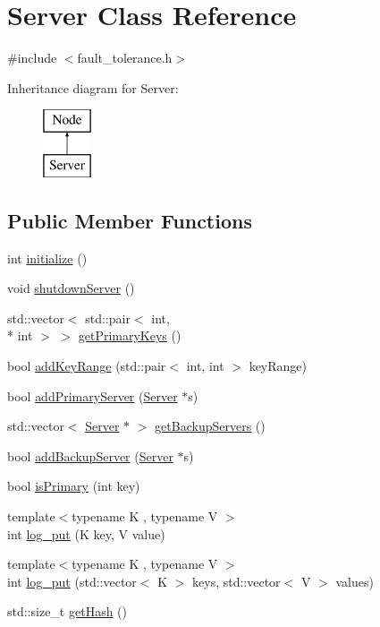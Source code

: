 \hypertarget{classServer}{\section{Server Class Reference}
\label{classServer}
}


{\ttfamily \#include $<$fault\-\_\-tolerance.\-h$>$}

Inheritance diagram for Server\-:\begin{figure}[H]
\begin{center}
\leavevmode
\includegraphics[height=2.000000cm]{classServer}
\end{center}
\end{figure}
\subsection*{Public Member Functions}
\begin{DoxyCompactItemize}
\item 
int \hyperlink{classServer_ae94d08657f48a3b51b411463f1137375}{initialize} ()
\item 
void \hyperlink{classServer_a4ce7fd6ac1a1f940db29e57f5f33ae9b}{shutdown\-Server} ()
\item 
std\-::vector$<$ std\-::pair$<$ int, \\*
int $>$ $>$ \hyperlink{classServer_ad303d839086eee11137e6fc4a4bb95ab}{get\-Primary\-Keys} ()
\item 
bool \hyperlink{classServer_a395d7cb7194064c961710663926e4a3d}{add\-Key\-Range} (std\-::pair$<$ int, int $>$ key\-Range)
\item 
bool \hyperlink{classServer_a2f865f52beecb3be03eda85b4dc64e3e}{add\-Primary\-Server} (\hyperlink{classServer}{Server} $\ast$s)
\item 
std\-::vector$<$ \hyperlink{classServer}{Server} $\ast$ $>$ \hyperlink{classServer_a71a34c248da1cb74f3453f06223a606e}{get\-Backup\-Servers} ()
\item 
bool \hyperlink{classServer_ab272570a3b1d8eb7f9037c9e7b4e5f2a}{add\-Backup\-Server} (\hyperlink{classServer}{Server} $\ast$s)
\item 
bool \hyperlink{classServer_a9bd7a3b2b12f2f5bddd68eb245111d02}{is\-Primary} (int key)
\item 
{\footnotesize template$<$typename K , typename V $>$ }\\int \hyperlink{classServer_afb4289a5db1c23ac566dbb085a8f91fb}{log\-\_\-put} (K key, V value)
\item 
{\footnotesize template$<$typename K , typename V $>$ }\\int \hyperlink{classServer_ae419ba1245066b80f42302bb0c86ed00}{log\-\_\-put} (std\-::vector$<$ K $>$ keys, std\-::vector$<$ V $>$ values)
\item 
std\-::size\-\_\-t \hyperlink{classServer_adecf34082977620ca31ca8eab317cf6d}{get\-Hash} ()
\end{DoxyCompactItemize}

